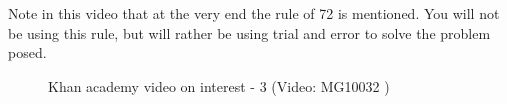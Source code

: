 \label{m39335*eip-20913}Note in this video that at the very end the rule of 72 is mentioned. You will not be using this rule, but will rather be using trial and error to solve the problem posed. 
    \setcounter{subfigure}{0}
	\begin{figure}[H] %
    \textnormal{Khan academy video on interest - 3}\vspace{.1in} \nopagebreak
  \label{m39335*yt-media3}\label{m39335*yt-video3}
             { (Video:  MG10032 )}
      \vspace{2pt}
    \vspace{.1in}
 \end{figure}       \par 
    \label{m39335*cid8}
